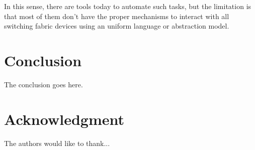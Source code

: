 \documentclass[conference]{IEEEtran/IEEEtran}
\begin{document}
In this sense, there are tools today to automate such tasks, but the limitation is that most of them don't have the proper mechanisms to interact with all switching fabric devices using an uniform language or abstraction model.


\section{Conclusion}
The conclusion goes here.






\section*{Acknowledgment}


The authors would like to thank...








%
%






\end{document}
